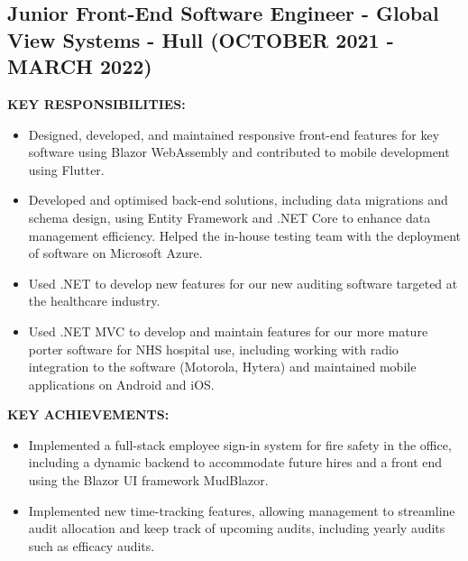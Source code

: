 \documentclass{article}
\begin{document}
\subsection{Junior Front-End Software Engineer - \textnormal{Global View Systems - Hull} \footnotesize{(OCTOBER 2021 - MARCH 2022)}}
\begin{minipage}[t]{1\textwidth}
    \footnotesize{\textbf{KEY RESPONSIBILITIES:}}
    \normalsize{}
    \begin{itemize}[leftmargin=*]
        \item Designed, developed, and maintained responsive front-end features for key software using Blazor WebAssembly and contributed to mobile development using Flutter.
        \item Developed and optimised back-end solutions, including data migrations and schema design, using Entity Framework and .NET Core to enhance data management efficiency. Helped the in-house testing team with the deployment of software on Microsoft Azure.
        \item Used .NET to develop new features for our new auditing software targeted at the healthcare industry.
        \item Used .NET MVC to develop and maintain features for our more mature porter software for NHS hospital use, including working with radio integration to the software (Motorola, Hytera) and maintained mobile applications on Android and iOS.
    \end{itemize}
\end{minipage}
\begin{minipage}[t]{1\textwidth}
    \vspace{1em}
    \footnotesize{\textbf{KEY ACHIEVEMENTS:}}
    \normalsize{}
    \begin{itemize}[leftmargin=*]
        \item Implemented a full-stack employee sign-in system for fire safety in the office, including a dynamic backend to accommodate future hires and a front end using the Blazor UI framework MudBlazor.
        \item Implemented new time-tracking features, allowing management to streamline audit allocation and keep track of upcoming audits, including yearly audits such as efficacy audits.
    \end{itemize}
\end{minipage}
\end{document}

